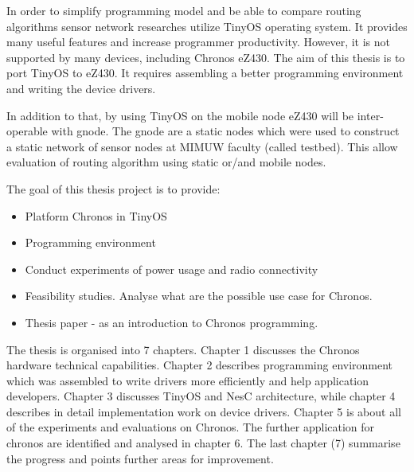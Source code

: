 In order to simplify programming model and be able to compare routing algorithms sensor network researches utilize TinyOS operating system. It provides many useful features and increase programmer productivity. However, it is not supported by many devices, including Chronos eZ430. The aim of this thesis is to port TinyOS to eZ430. It requires assembling a better programming environment and writing the device drivers.

In addition to that, by using TinyOS on the mobile node eZ430 will be inter-operable with gnode. The gnode are a static nodes which were used to construct a static network of sensor nodes at MIMUW faculty (called testbed). This allow evaluation of routing algorithm using static or/and mobile nodes. 

The goal of this thesis project is to provide:
\begin{itemize}
  \item Platform Chronos in TinyOS
  \item Programming environment
  \item Conduct experiments of power usage and radio connectivity
  \item Feasibility studies. Analyse what are the possible use case for Chronos.
  \item Thesis paper - as an introduction to Chronos programming.
\end{itemize}

The thesis is organised into 7 chapters. Chapter 1 discusses the Chronos hardware technical capabilities. Chapter 2 describes programming environment which was assembled to write drivers more efficiently and help application developers. Chapter 3 discusses TinyOS and NesC architecture, while chapter 4 describes in detail implementation work on device drivers. Chapter 5 is about all of the experiments and evaluations on Chronos. The further application for chronos are identified and analysed in chapter 6. The last chapter (7) summarise the progress and points further areas for improvement.

